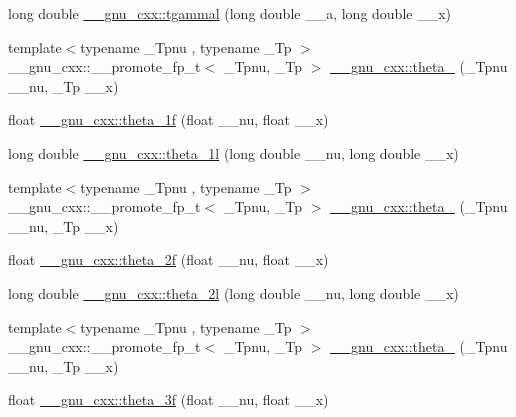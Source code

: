 \begin{DoxyCompactItemize}
\item 
long double \hyperlink{group__gnu__math__spec__func_gabebff9ffba6acf55f3a3cd716ef5007a}{\+\_\+\+\_\+gnu\+\_\+cxx\+::tgammal} (long double \+\_\+\+\_\+a, long double \+\_\+\+\_\+x)
\item 
{\footnotesize template$<$typename \+\_\+\+Tpnu , typename \+\_\+\+Tp $>$ }\\\+\_\+\+\_\+gnu\+\_\+cxx\+::\+\_\+\+\_\+promote\+\_\+fp\+\_\+t$<$ \+\_\+\+Tpnu, \+\_\+\+Tp $>$ \hyperlink{group__gnu__math__spec__func_gac122af3ffd2e5536fdf021afce79b7d4}{\+\_\+\+\_\+gnu\+\_\+cxx\+::theta\+\_} (\+\_\+\+Tpnu \+\_\+\+\_\+nu, \+\_\+\+Tp \+\_\+\+\_\+x)
\item 
float \hyperlink{group__gnu__math__spec__func_ga5bbf256b875da28132f9049f5984cb14}{\+\_\+\+\_\+gnu\+\_\+cxx\+::theta\+\_\+1f} (float \+\_\+\+\_\+nu, float \+\_\+\+\_\+x)
\item 
long double \hyperlink{group__gnu__math__spec__func_ga3520684c78771ffa57180060c8b6d1ca}{\+\_\+\+\_\+gnu\+\_\+cxx\+::theta\+\_\+1l} (long double \+\_\+\+\_\+nu, long double \+\_\+\+\_\+x)
\item 
{\footnotesize template$<$typename \+\_\+\+Tpnu , typename \+\_\+\+Tp $>$ }\\\+\_\+\+\_\+gnu\+\_\+cxx\+::\+\_\+\+\_\+promote\+\_\+fp\+\_\+t$<$ \+\_\+\+Tpnu, \+\_\+\+Tp $>$ \hyperlink{group__gnu__math__spec__func_gacec36dc316e561bbaa371c60c06e52f7}{\+\_\+\+\_\+gnu\+\_\+cxx\+::theta\+\_} (\+\_\+\+Tpnu \+\_\+\+\_\+nu, \+\_\+\+Tp \+\_\+\+\_\+x)
\item 
float \hyperlink{group__gnu__math__spec__func_ga78e832796aedf5159b142801e1184392}{\+\_\+\+\_\+gnu\+\_\+cxx\+::theta\+\_\+2f} (float \+\_\+\+\_\+nu, float \+\_\+\+\_\+x)
\item 
long double \hyperlink{group__gnu__math__spec__func_gac5a30c772d4888442665945e7f3fa017}{\+\_\+\+\_\+gnu\+\_\+cxx\+::theta\+\_\+2l} (long double \+\_\+\+\_\+nu, long double \+\_\+\+\_\+x)
\item 
{\footnotesize template$<$typename \+\_\+\+Tpnu , typename \+\_\+\+Tp $>$ }\\\+\_\+\+\_\+gnu\+\_\+cxx\+::\+\_\+\+\_\+promote\+\_\+fp\+\_\+t$<$ \+\_\+\+Tpnu, \+\_\+\+Tp $>$ \hyperlink{group__gnu__math__spec__func_ga34e5d79e6ba8b8b104e690fc1ebc7fd6}{\+\_\+\+\_\+gnu\+\_\+cxx\+::theta\+\_} (\+\_\+\+Tpnu \+\_\+\+\_\+nu, \+\_\+\+Tp \+\_\+\+\_\+x)
\item 
float \hyperlink{group__gnu__math__spec__func_ga9a7c967d2a456f1a6aceee9a53f024b1}{\+\_\+\+\_\+gnu\+\_\+cxx\+::theta\+\_\+3f} (float \+\_\+\+\_\+nu, float \+\_\+\+\_\+x)

\end{DoxyCompactItemize}
